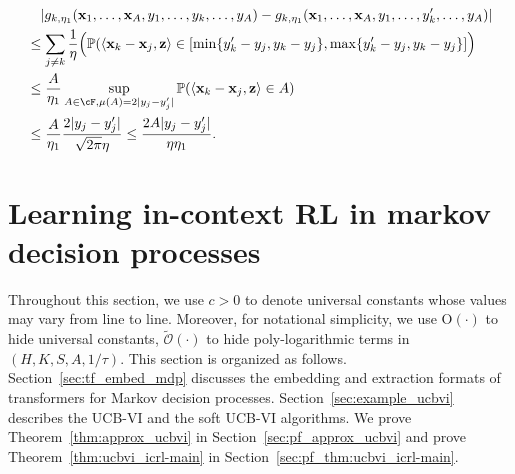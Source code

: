 \documentclass[10pt]{article}
\newcommand{\<}{\left\langle}
\renewcommand{\>}{\right\rangle}
\renewcommand{\P}{\mathbb{P}}
\newcommand{\temp}{{\tau}}
\newcommand{\trunprob}{{\eta_1}}
\newcommand{\Trunregp}{{\eta}}
\newcommand{\tcO}{{\tilde{\mathcal O}}}
\newcommand{\Numepi}{{K}}
\newcommand{\horizon}{{H}}
\renewcommand{\horizon}{{H}}
\newcommand{\Numst}{{S}}
\newcommand{\Numact}{{A}}
\newcommand{\conO}{{\mathrm{O}}}
\def\bx{{\mathbf x}}
\def\bz{{\mathbf z}}
\begin{document}
\begin{align*}
    &\quad|g_{k,\trunprob}(\bx_1,\ldots,\bx_A,y_1,\ldots,y_k,\ldots,y_A)-g_{k,\trunprob}(\bx_1,\ldots,\bx_A,y_1,\ldots,y_k',\ldots,y_A)|\\
    &\leq
    \sum_{j\neq k}\frac{1}{\Trunregp}
    \Big(\P( \<\bx_k-\bx_j,\bz\>\in[\min\{y_k'-y_j,y_k-y_j\},\max\{y_k'-y_j,y_k-y_j\}]\Big)\\
      &\leq
      \frac{A}{\trunprob}\sup_{A\in\cF,\mu(A)=2|y_j-y_j'|}\P(\<\bx_k-\bx_j,\bz\>\in A)\\
      &\leq
   \frac{A}{\trunprob}\frac{2|y_j-y_j'|}{\sqrt{2\pi}\Trunregp}\leq \frac{2A|y_j-y_j'|}{\Trunregp\trunprob}.
\end{align*}
\section{Learning in-context RL in markov decision processes}
Throughout this section, we use $c>0$ to denote universal constants whose values may vary from line to line.
Moreover, for notational simplicity, we use $\conO(\cdot)$ to hide universal constants,  $\tcO(\cdot)$ to hide poly-logarithmic terms in $(\horizon,\Numepi,\Numst,\Numact,1/\temp)$.
This section is organized as follows. Section~\ref{sec:tf_embed_mdp} discusses the embedding and extraction formats of transformers for Markov decision processes. Section~\ref{sec:example_ucbvi} describes the UCB-VI and the soft UCB-VI algorithms.  We prove Theorem~\ref{thm:approx_ucbvi} in Section~\ref{sec:pf_approx_ucbvi} and prove Theorem~\ref{thm:ucbvi_icrl-main} in Section~\ref{sec:pf_thm:ucbvi_icrl-main}.
\end{document}
